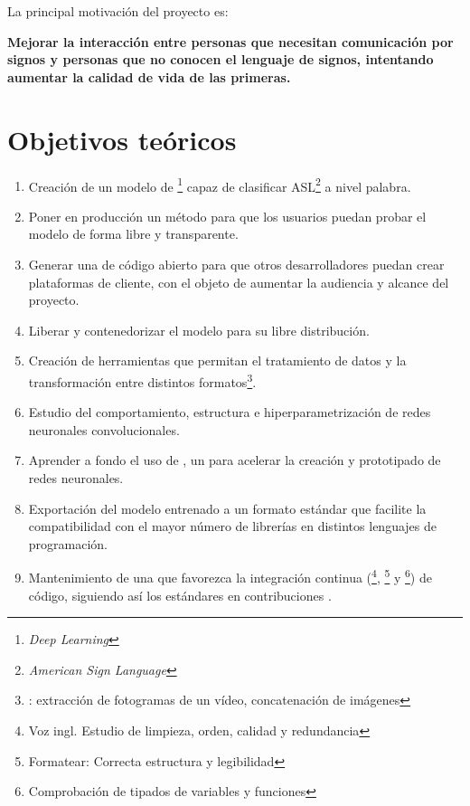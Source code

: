 
La principal motivación del proyecto es:

\textbf{
  Mejorar la interacción entre personas que necesitan comunicación por signos y personas que no conocen el lenguaje de signos, intentando aumentar la calidad de vida de las primeras.
}


\section{Objetivos teóricos}

\begin{enumerate}
  \item Creación de un modelo de \footnote{\textit{Deep Learning}} capaz de clasificar ASL\footnote{\textit{American Sign Language}} a nivel palabra.
  \item Poner en producción un método para que los usuarios puedan probar el modelo de forma libre y transparente.
  \item Generar una  de código abierto para que otros desarrolladores puedan crear plataformas de cliente, con el objeto de aumentar la audiencia y alcance del proyecto.
  \item Liberar y contenedorizar el modelo para su libre distribución.
  \item Creación de herramientas que permitan el tratamiento de datos y la transformación entre distintos formatos\footnote{\pe: extracción de fotogramas de un vídeo, concatenación de imágenes}.
  \item Estudio del comportamiento, estructura e hiperparametrización de redes neuronales convolucionales.
  \item Aprender a fondo el uso de \cite{PYTORCH}, un  para acelerar la creación y prototipado de redes neuronales.
  \item Exportación del modelo entrenado a un formato estándar que facilite la compatibilidad con el mayor número de librerías en distintos lenguajes de programación.
  \item Mantenimiento de una  que favorezca la integración continua (\footnote{Voz ingl. Estudio de limpieza, orden, calidad y redundancia}, \footnote{Formatear: Correcta estructura y legibilidad} y \footnote{Comprobación de tipados de variables y funciones}) de código, siguiendo así los estándares en contribuciones .
\end{enumerate}


